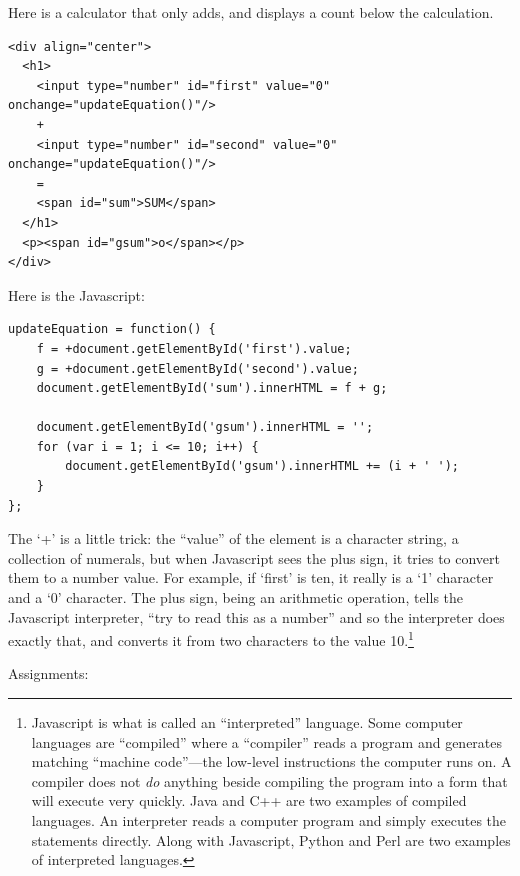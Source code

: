 \documentclass[11pt]{article}
\begin{document}
Here is a calculator that only adds, and displays a count
below the calculation.

\begin{verbatim}
<div align="center">
  <h1>
    <input type="number" id="first" value="0" onchange="updateEquation()"/>
    +
    <input type="number" id="second" value="0" onchange="updateEquation()"/>
    =
    <span id="sum">SUM</span>
  </h1>
  <p><span id="gsum">o</span></p>
</div>
\end{verbatim}

Here is the Javascript:

\begin{verbatim}
updateEquation = function() {
    f = +document.getElementById('first').value;
    g = +document.getElementById('second').value;
    document.getElementById('sum').innerHTML = f + g;

    document.getElementById('gsum').innerHTML = '';
    for (var i = 1; i <= 10; i++) {
        document.getElementById('gsum').innerHTML += (i + ' ');
    }
};
\end{verbatim}

The `+' is a little trick: the ``value'' of the element is a character
string, a collection of numerals, but when Javascript sees the plus
sign, it tries to convert them to a number value.  For example, if
`first' is ten, it really is a `1' character and a `0' character.  The
plus sign, being an arithmetic operation, tells the Javascript
interpreter, ``try to read this as a number'' and so the interpreter
does exactly that, and converts it from two characters to the value
10.\footnote{Javascript is what is called an
  ``interpreted'' language.  Some computer languages are ``compiled''
  where a ``compiler'' reads a program and generates matching
  ``machine code''---the low-level instructions the computer runs on.
  A compiler does not \emph{do} anything beside compiling the program
  into a form that will execute very quickly.  Java and C++ are two
  examples of compiled languages.  An interpreter reads a computer
  program and simply executes the statements directly.  Along with
  Javascript, Python and Perl are two examples of interpreted
  languages.}

Assignments:
\end{document}
